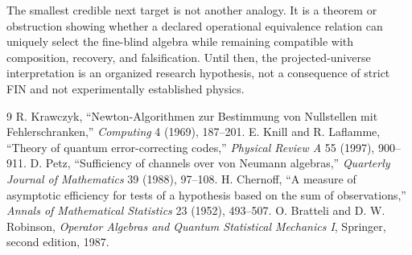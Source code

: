 \documentclass[11pt,a4paper]{article}
\begin{document}
The smallest credible next target is not another analogy. It is a theorem or obstruction showing whether a declared operational equivalence relation can uniquely select the fine-blind algebra while remaining compatible with composition, recovery, and falsification. Until then, the projected-universe interpretation is an organized research hypothesis, not a consequence of strict FIN and not experimentally established physics.

\begin{thebibliography}{9}
 R. Krawczyk, ``Newton-Algorithmen zur Bestimmung von Nullstellen mit Fehlerschranken,'' \emph{Computing} 4 (1969), 187--201.
 E. Knill and R. Laflamme, ``Theory of quantum error-correcting codes,'' \emph{Physical Review A} 55 (1997), 900--911.
 D. Petz, ``Sufficiency of channels over von Neumann algebras,'' \emph{Quarterly Journal of Mathematics} 39 (1988), 97--108.
 H. Chernoff, ``A measure of asymptotic efficiency for tests of a hypothesis based on the sum of observations,'' \emph{Annals of Mathematical Statistics} 23 (1952), 493--507.
 O. Bratteli and D. W. Robinson, \emph{Operator Algebras and Quantum Statistical Mechanics I}, Springer, second edition, 1987.
\end{thebibliography}
\end{document}
